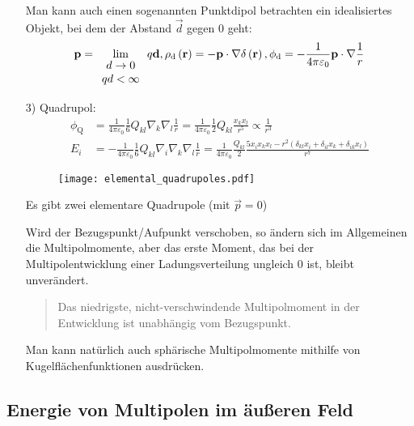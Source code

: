 \begin{enumerate}[1)]
		Man kann auch einen sogenannten Punktdipol betrachten \textendash{} ein idealisiertes Objekt, bei dem der Abstand $\vec {d}$ gegen $0$ geht:
		\begin{equation*}
			\mathbf{p}=\lim _{\begin{array}{c}
					d\rightarrow 0 \\
					qd<\infty\end{array}} q\mathbf{d}, \rho _{\text{d} }\left(\mathbf{r}\right)=-\mathbf{p}\cdot \nabla \delta \left(\mathbf{r}\right), \phi _{\text{d} }=-\frac{1}{4\pi \varepsilon _{0}}\mathbf{p}\cdot \nabla \frac{1}{r}
		\end{equation*}
	\item[3)] Quadrupol:
		\begin{align*}
				\phi _{\mathrm{Q}}&=\frac{1}{4\pi \varepsilon _{0}}\frac{1}{6}Q_{kl}\nabla _{k}\nabla _{l}\frac{1}{r}=\frac{1}{4\pi \varepsilon _{0}}\frac{1}{2}Q_{kl}\frac{x_{k}x_{l}}{r^{5}}\propto \frac{1}{r^{3}} \\
				E_{i}&=-\frac{1}{4\pi \varepsilon _{0}}\frac{1}{6}Q_{kl}\nabla _{i}\nabla _{k}\nabla _{l}\frac{1}{r}=\frac{1}{4\pi \varepsilon _{0}}\frac{Q_{kl}}{2}\frac{5x_{i}x_{k}x_{l}-r^{2}\left(\delta _{kl}x_{i}+\delta _{il}x_{k}+\delta _{ik}x_{l}\right)}{r^{7}}
		\end{align*}


		\begin{figure}[htb]
			\centering
			\texttt{[image: elemental\_quadrupoles.pdf]}
			\caption{}
			\label{fig:elemental_quadrupoles}
		\end{figure}

		Es gibt zwei elementare Quadrupole (mit $\vec {p}=0$)

		Wird der Bezugspunkt/Aufpunkt verschoben, so ändern sich im Allgemeinen die Multipolmomente, aber das erste Moment, das bei der Multipolentwicklung einer Ladungsverteilung ungleich $0$ ist, bleibt unverändert.


		\begin{quote}
			Das niedrigste, nicht-verschwindende Multipolmoment in der Entwicklung ist unabhängig vom Bezugspunkt.
		\end{quote}
		Man kann natürlich auch sphärische Multipolmomente mithilfe von Kugelflächenfunktionen ausdrücken.

\end{enumerate}
\subsection{Energie von Multipolen im äußeren Feld\label{ref-034}}

